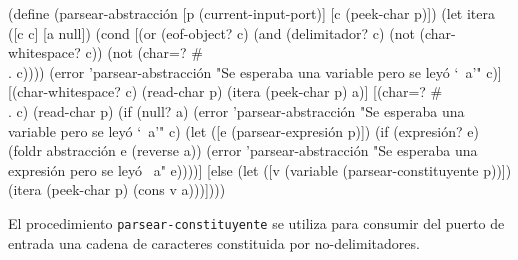 \documentclass[letterpaper,twoside,openright,10pt]{book}
\begin{document}
\nwenddocs{}\plusendmoddef
(define (parsear-abstracción [p (current-input-port)]
                             [c (peek-char p)])
  (let itera ([c c]
              [a null])
    (cond [(or (eof-object? c)
               (and (delimitador? c) (not (char-whitespace? c)) (not (char=? #\\. c))))
           (error 'parsear-abstracción "Se esperaba una variable pero se leyó `~a'" c)]
          [(char-whitespace? c)
           (read-char p)
           (itera (peek-char p) a)]
          [(char=? #\\. c)
           (read-char p)
           (if (null? a)
               (error 'parsear-abstracción "Se esperaba una variable pero se leyó `~a'" c)
               (let ([e (parsear-expresión p)])
                 (if (expresión? e)
                     (foldr abstracción e (reverse a))
                     (error 'parsear-abstracción "Se esperaba una expresión pero se leyó ~a" e))))]
          [else
           (let ([v (variable (parsear-constituyente p))])
             (itera (peek-char p) (cons v a)))])))

\eatline
{}\nwendcode{}\nwdocspar

El procedimiento {\tt{}\protect{}parsear-constituyente} se utiliza para consumir del puerto de entrada una cadena de caracteres constituida por no-delimitadores.
\end{document}
